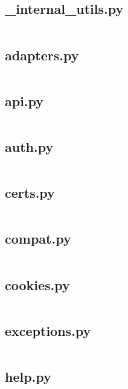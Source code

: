 \documentclass{article}
\begin{document}
\subsection{\_internal\_utils.py}
\inputminted{python}{/tmp/requests/requests/_internal_utils.py}
\newpage

\subsection{adapters.py}
\inputminted{python}{/tmp/requests/requests/adapters.py}
\newpage

\subsection{api.py}
\inputminted{python}{/tmp/requests/requests/api.py}
\newpage

\subsection{auth.py}
\inputminted{python}{/tmp/requests/requests/auth.py}
\newpage

\subsection{certs.py}
\inputminted{python}{/tmp/requests/requests/certs.py}
\newpage

\subsection{compat.py}
\inputminted{python}{/tmp/requests/requests/compat.py}
\newpage

\subsection{cookies.py}
\inputminted{python}{/tmp/requests/requests/cookies.py}
\newpage

\subsection{exceptions.py}
\inputminted{python}{/tmp/requests/requests/exceptions.py}
\newpage

\subsection{help.py}
\inputminted{python}{/tmp/requests/requests/help.py}
\newpage
\end{document}
